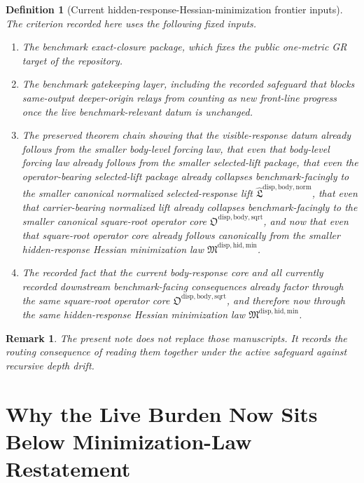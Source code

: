 \documentclass[11pt]{article}
\newcommand{\HiddenMinimizationPackage}{\mathfrak M^{\mathrm{disp,hid,min}}}
\newcommand{\SquareRootOperatorCore}{\mathfrak O^{\mathrm{disp,body,sqrt}}}
\newcommand{\NormalizedLiftPackage}{\widehat{\mathfrak L}^{\mathrm{disp,body,norm}}}
\newtheorem{definition}{Definition}
\newtheorem{remark}{Remark}
\begin{document}
\begin{definition}[Current hidden-response-Hessian-minimization frontier inputs]
The criterion recorded here uses the following fixed inputs.
\begin{enumerate}
    \item The benchmark exact-closure package, which fixes the public one-metric GR target of the repository.
    \item The benchmark gatekeeping layer, including the recorded safeguard that blocks same-output deeper-origin relays from counting as new front-line progress once the live benchmark-relevant datum is unchanged.
    \item The preserved theorem chain showing that the visible-response datum already follows from the smaller body-level forcing law, that even that body-level forcing law already follows from the smaller selected-lift package, that even the operator-bearing selected-lift package already collapses benchmark-facingly to the smaller canonical normalized selected-response lift \(\NormalizedLiftPackage\), that even that carrier-bearing normalized lift already collapses benchmark-facingly to the smaller canonical square-root operator core \(\SquareRootOperatorCore\), and now that even that square-root operator core already follows canonically from the smaller hidden-response Hessian minimization law \(\HiddenMinimizationPackage\).
    \item The recorded fact that the current body-response core and all currently recorded downstream benchmark-facing consequences already factor through the same square-root operator core \(\SquareRootOperatorCore\), and therefore now through the same hidden-response Hessian minimization law \(\HiddenMinimizationPackage\).
\end{enumerate}
\end{definition}

\begin{remark}
The present note does not replace those manuscripts. It records the routing consequence of reading them together under the active safeguard against recursive depth drift.
\end{remark}

\section{Why the Live Burden Now Sits Below Minimization-Law Restatement}
\end{document}
